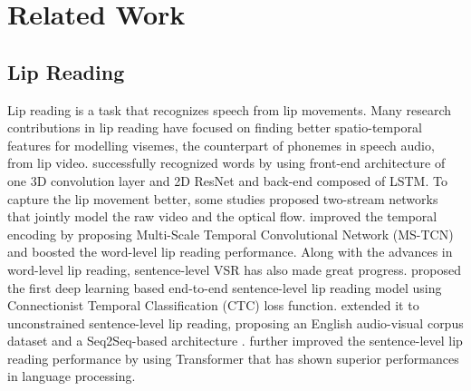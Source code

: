 \documentclass[letterpaper]{article} \usepackage{aaai22}  \usepackage{times}  \usepackage{helvet}  \usepackage{courier}  \usepackage[hyphens]{url}  \usepackage{graphicx} \urlstyle{rm} \def\UrlFont{\rm}  \usepackage{natbib}  \usepackage{caption} \DeclareCaptionStyle{ruled}{labelfont=normalfont,labelsep=colon,strut=off} \frenchspacing  \setlength{\pdfpagewidth}{8.5in}  \setlength{\pdfpageheight}{11in}  \usepackage{algorithm}
\begin{document}
\section{Related Work}
\subsection{Lip Reading}
Lip reading \cite{chung2016lrw,ma2021denselyconnected,akbari2018lip2audspec,kim2021vcagan} is a task that recognizes speech from lip movements. Many research contributions in lip reading have focused on finding better spatio-temporal features for modelling visemes, the counterpart of phonemes in speech audio, from lip video. \cite{petridis2017resnetlstm} successfully recognized words by using front-end architecture of one 3D convolution layer and 2D ResNet \cite{he2016resnet} and back-end composed of LSTM. To capture the lip movement better, some studies \cite{weng2019twostream, xiao2020deformation} proposed two-stream networks that jointly model the raw video and the optical flow. \cite{martinez2020mstcn} improved the temporal encoding by proposing Multi-Scale Temporal Convolutional Network (MS-TCN) and boosted the word-level lip reading performance. Along with the advances in word-level lip reading, sentence-level VSR has also made great progress. \cite{assael2016lipnet} proposed the first deep learning based end-to-end sentence-level lip reading model using Connectionist Temporal Classification (CTC) \cite{graves2006ctc} loss function. \cite {chung2017lrs2} extended it to unconstrained sentence-level lip reading, proposing an English audio-visual corpus dataset and a Seq2Seq-based architecture \cite{cho2014seq2seq}. \cite{afouras2018deep} further improved the sentence-level lip reading performance by using Transformer \cite{vaswani2017attention} that has shown superior performances in language processing.
\end{document}
